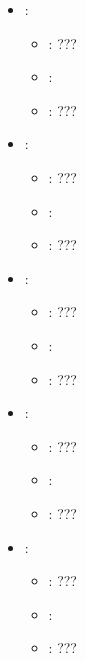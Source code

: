\begin{itemize}
    \item {}:
           \begin{itemize}
                \item \optionPossibleValues{}: ???
                \item \optionDefaultValue{}: 
                \item \optionDescrption{}: ???
           \end{itemize}
    \item {}:
           \begin{itemize}
                \item \optionPossibleValues{}: ???
                \item \optionDefaultValue{}: 
                \item \optionDescrption{}: ???
           \end{itemize}
    \item {}:
           \begin{itemize}
                \item \optionPossibleValues{}: ???
                \item \optionDefaultValue{}: 
                \item \optionDescrption{}: ???
           \end{itemize}
    \item {}:
           \begin{itemize}
                \item \optionPossibleValues{}: ???
                \item \optionDefaultValue{}: 
                \item \optionDescrption{}: ???
           \end{itemize}
    \item {}:
           \begin{itemize}
                \item \optionPossibleValues{}: ???
                \item \optionDefaultValue{}: 
                \item \optionDescrption{}: ???
           \end{itemize}
\end{itemize}
